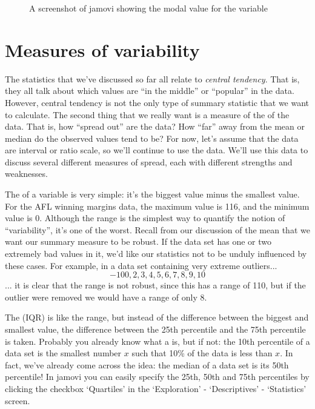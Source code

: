 \vspace{1cm}
\begin{figure}[h]
\begin{center}
\caption{A screenshot of jamovi showing the modal value for the  variable }
\label{fig:aflsmall_margins_mode}
\HR
\end{center}
\end{figure}


\section{Measures of variability\label{sec:var}}

The statistics that we've discussed so far all relate to {\it central tendency}. That is, they all talk about which values are ``in the middle'' or ``popular'' in the data. However, central tendency is not the only type of summary statistic that we want to calculate. The second thing that we really want is a measure of the  of the data. That is, how ``spread out'' are the data? How ``far'' away from the mean or median do the observed values tend to be? For now, let's assume that the data are interval or ratio scale, so we'll continue to use the  data.  We'll use this data to discuss several different measures of spread, each with different strengths and weaknesses. 


The  of a variable is very simple: it's the biggest value minus the smallest value. For the AFL winning margins data, the maximum value is 116, and the minimum value is 0. Although the range is the simplest way to quantify the notion of ``variability'', it's one of the worst. Recall from our discussion of the mean that we want our summary measure to be robust. If the data set has one or two extremely bad values in it, we'd like our statistics not to be unduly influenced by these cases. For example, in a data set containing very extreme outliers...
$$
-100,2,3,4,5,6,7,8,9,10
$$
... it is clear that the range is not robust, since this has a range of 110, but if the outlier were removed we would have a range of only 8.


The  (IQR) is like the range, but instead of the difference between the biggest and smallest value, the difference between the 25th percentile and the 75th percentile is taken. Probably you already know what a  is, but if not: the 10th percentile of a data set is the smallest number $x$ such that 10\% of the data is less than $x$. In fact, we've already come across the idea: the median of a data set is its 50th percentile! In jamovi you can easily specify the 25th, 50th and 75th percentiles by clicking the checkbox `Quartiles' in the `Exploration' - `Descriptives' - `Statistics' screen. 

